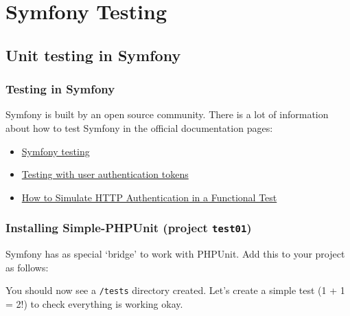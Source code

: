 \documentclass[a4paperpaper,openright]{book}
\newenvironment{Shaded}{}{}
\newcommand{\ExtensionTok}[1]{#1}
\newcommand{\NormalTok}[1]{#1}
\begin{document}
\part{Symfony Testing}

\hypertarget{unit-testing-in-symfony}{%
\chapter{Unit testing in Symfony}\label{unit-testing-in-symfony}}

\hypertarget{testing-in-symfony}{%
\section{Testing in Symfony}\label{testing-in-symfony}}

Symfony is built by an open source community. There is a lot of
information about how to test Symfony in the official documentation
pages:

\begin{itemize}
\item
  \href{http://symfony.com/doc/current/testing.html}{Symfony testing}
\item
  \href{http://symfony.com/doc/current/testing/simulating_authentication.html}{Testing
  with user authentication tokens}
\item
  \href{http://symfony.com/doc/current/testing/http_authentication.html}{How
  to Simulate HTTP Authentication in a Functional Test}
\end{itemize}

\hypertarget{installing-simple-phpunit-project-test01}{%
\section{\texorpdfstring{Installing Simple-PHPUnit (project
\texttt{test01})}{Installing Simple-PHPUnit (project test01)}}\label{installing-simple-phpunit-project-test01}}

Symfony has as special `bridge' to work with PHPUnit. Add this to your
project as follows:

\begin{Shaded}
\end{Shaded}

You should now see a \texttt{/tests} directory created. Let's create a
simple test (1 + 1 = 2!) to check everything is working okay.
\end{document}
